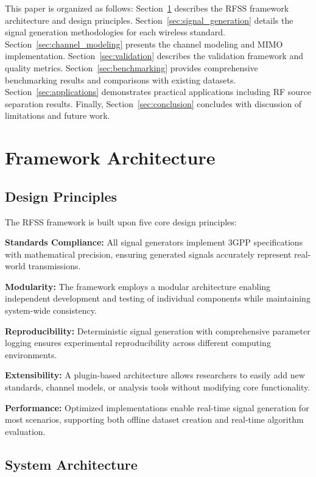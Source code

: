 \documentclass[conference]{IEEEtran}
\begin{document}
This paper is organized as follows: Section~\ref{sec:architecture} describes the RFSS framework architecture and design principles. Section~\ref{sec:signal_generation} details the signal generation methodologies for each wireless standard. Section~\ref{sec:channel_modeling} presents the channel modeling and MIMO implementation. Section~\ref{sec:validation} describes the validation framework and quality metrics. Section~\ref{sec:benchmarking} provides comprehensive benchmarking results and comparisons with existing datasets. Section~\ref{sec:applications} demonstrates practical applications including RF source separation results. Finally, Section~\ref{sec:conclusion} concludes with discussion of limitations and future work.

\section{Framework Architecture}
\label{sec:architecture}

\subsection{Design Principles}

The RFSS framework is built upon five core design principles:

\textbf{Standards Compliance:} All signal generators implement 3GPP specifications with mathematical precision, ensuring generated signals accurately represent real-world transmissions.

\textbf{Modularity:} The framework employs a modular architecture enabling independent development and testing of individual components while maintaining system-wide consistency.

\textbf{Reproducibility:} Deterministic signal generation with comprehensive parameter logging ensures experimental reproducibility across different computing environments.

\textbf{Extensibility:} A plugin-based architecture allows researchers to easily add new standards, channel models, or analysis tools without modifying core functionality.

\textbf{Performance:} Optimized implementations enable real-time signal generation for most scenarios, supporting both offline dataset creation and real-time algorithm evaluation.

\subsection{System Architecture}
\end{document}
